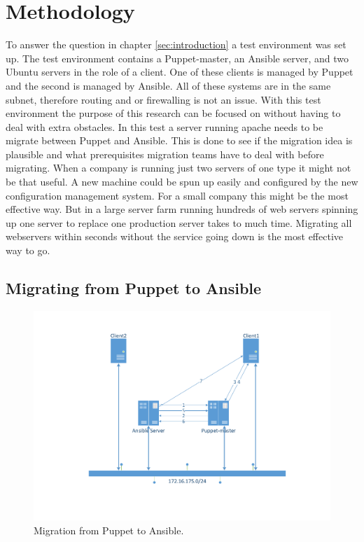 \section{Methodology}\label{sec:methodology}

To answer the question in chapter \ref{sec:introduction} a test environment was set up. The test environment contains a Puppet-master, an Ansible server, and two Ubuntu servers in the role of a  client. One of these clients is managed by Puppet and the second is managed by Ansible. All of these systems are in the same subnet, therefore routing and or firewalling is not an issue. With this test environment the purpose of this research can be focused on without having to deal with extra obstacles.  
In this test a server running apache needs to be  migrate between Puppet and Ansible. This is done to see if the migration idea is plausible and what prerequisites migration teams have to deal with before migrating. When a company is running just two servers of one type it might not be that useful. A new machine could be spun up easily and configured by the new configuration management system. For a small company this might be the most effective way. But in a large server farm running hundreds of web servers spinning up one server to replace one production server takes to much time. Migrating all webservers within seconds without the service going down is the most effective way to go.  

\subsection{Migrating from Puppet to Ansible}\label{subsec:puppettoansible}

\begin{figure}[!hb]
        \includegraphics[scale=0.5]{img/PuppettoAnsible.pdf}
        \caption{Migration from Puppet to Ansible.}
        \label{fig:situation1}
\end{figure}

